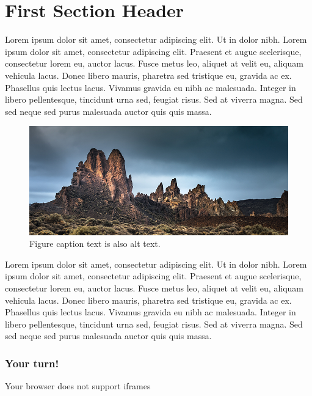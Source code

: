 \documentclass[
]{book}
\begin{document}
\hypertarget{first-section-header-1}{%
\section{First Section Header}\label{first-section-header-1}}

Lorem ipsum dolor sit amet, consectetur adipiscing elit. Ut in dolor nibh. Lorem ipsum dolor sit amet, consectetur adipiscing elit. Praesent et augue scelerisque, consectetur lorem eu, auctor lacus. Fusce metus leo, aliquet at velit eu, aliquam vehicula lacus. Donec libero mauris, pharetra sed tristique eu, gravida ac ex. Phasellus quis lectus lacus. Vivamus gravida eu nibh ac malesuada. Integer in libero pellentesque, tincidunt urna sed, feugiat risus. Sed at viverra magna. Sed sed neque sed purus malesuada auctor quis quis massa.

\begin{figure}
\centering
\includegraphics{images/01-image.png}
\caption{Figure caption text is also alt text.}
\end{figure}

Lorem ipsum dolor sit amet, consectetur adipiscing elit. Ut in dolor nibh. Lorem ipsum dolor sit amet, consectetur adipiscing elit. Praesent et augue scelerisque, consectetur lorem eu, auctor lacus. Fusce metus leo, aliquet at velit eu, aliquam vehicula lacus. Donec libero mauris, pharetra sed tristique eu, gravida ac ex. Phasellus quis lectus lacus. Vivamus gravida eu nibh ac malesuada. Integer in libero pellentesque, tincidunt urna sed, feugiat risus. Sed at viverra magna. Sed sed neque sed purus malesuada auctor quis quis massa.

\hypertarget{your-turn-2}{%
\subsubsection*{Your turn!}\label{your-turn-2}}

Your browser does not support iframes
\end{document}
